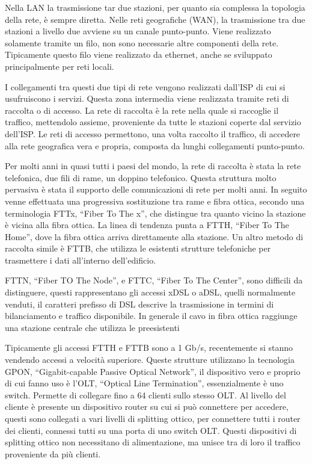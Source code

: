 \documentclass{article}
\numberwithin{equation}{subsection}
\begin{document}
Nella LAN la trasmissione tar due stazioni, per quanto sia complessa la topologia della rete, è sempre diretta. Nelle reti geografiche (WAN), la trasmissione tra due 
stazioni a livello due avviene su un canale punto-punto. Viene realizzato solamente tramite un filo, non sono necessarie altre componenti della rete. Tipicamente 
questo filo viene realizzato da ethernet, anche se sviluppato principalmente per reti locali. 

I collegamenti tra questi due tipi di rete vengono realizzati dall'ISP di cui si usufruiscono i servizi. Questa zona intermedia viene realizzata tramite reti di 
raccolta o di accesso. La rete di raccolta è la rete nella quale si raccoglie il traffico, mettendolo assieme, proveniente da tutte le stazioni coperte dal servizio 
dell'ISP. Le reti di accesso permettono, una volta raccolto il traffico, di accedere alla rete geografica vera e propria, composta da lunghi collegamenti punto-punto. 


Per molti anni in quasi tutti i paesi del mondo, la rete di raccolta è stata la rete telefonica, due fili di rame, un doppino telefonico. Questa struttura molto 
pervasiva è stata il supporto delle comunicazioni di rete per molti anni. 
In seguito venne effettuata una progressiva sostituzione tra rame e fibra ottica, secondo una terminologia FTTx, ``Fiber To The x'', che distingue tra quanto vicino la stazione è 
vicina alla fibra ottica. La linea di tendenza punta a FTTH, ``Fiber To The Home'', dove la fibra ottica arriva direttamente alla stazione. Un altro metodo di 
raccolta simile è FTTB, che utilizza le esistenti strutture telefoniche per trasmettere i dati all'interno dell'edificio. 

FTTN, ``Fiber TO The Node'', e FTTC, ``Fiber To The Center'', sono difficili da distinguere, questi rappresentano gli accessi xDSL o aDSL, quelli normalmente venduti, il caratteri prefisso di DSL descrive la trasmissione 
in termini di bilanciamento e traffico disponibile. In generale il cavo in fibra ottica raggiunge una stazione centrale che utilizza le preesistenti 

Tipicamente gli accessi FTTH e FTTB sono a 1 Gb/s, recentemente si stanno vendendo accessi a velocità superiore. 
Queste strutture utilizzano la tecnologia GPON, ``Gigabit-capable Passive Optical Network'', il dispositivo vero e proprio di cui fanno uso è l'OLT, ``Optical Line Termination'', 
essenzialmente è uno switch. Permette di collegare fino a 64 clienti sullo stesso OLT. 
Al livello del cliente è presente un dispositivo router su cui si può connettere per accedere, questi sono collegati a vari livelli di splitting ottico, per connettere 
tutti i router dei clienti, connessi tutti su una porta di uno switch OLT. Questi dispositivi di splitting ottico non necessitano di alimentazione, ma unisce tra di loro 
il traffico proveniente da più clienti. 
\end{document}
